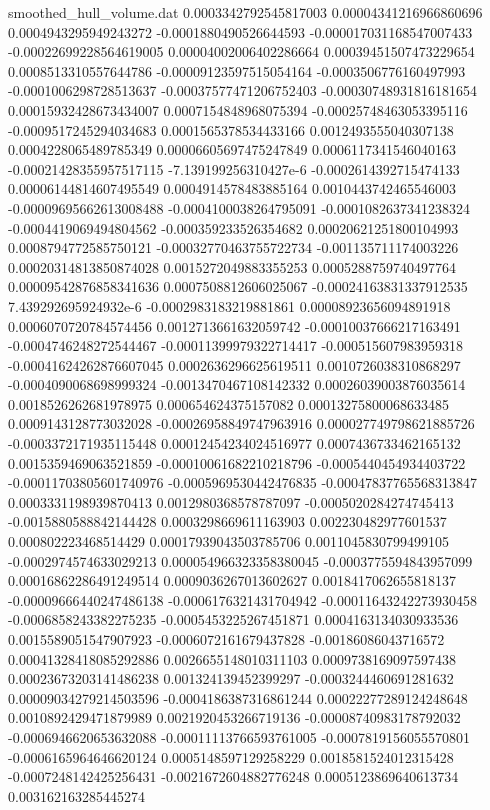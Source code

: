 \begin{filecontents}{smoothed_hull_volume.dat}
0.0003342792545817003	0.00004341216966860696	0.0004943295949243272	-0.0001880490526644593	-0.000017031168547007433	-0.00022699228564619005	0.00004002006402286664	0.00039451507473229654	0.0008513310557644786	-0.00009123597515054164	-0.0003506776160497993	-0.0001006298728513637	-0.00037577471206752403	-0.00030748931816181654	0.00015932428673434007	0.0007154848968075394	-0.00025748463053395116	-0.0009517245294034683	0.0001565378534433166	0.0012493555040307138
0.0004228065489785349	0.00006605697475247849	0.0006117341546040163	-0.00021428355957517115	-7.139199256310427e-6	-0.0002614392715474133	0.00006144814607495549	0.0004914578483885164	0.0010443742465546003	-0.00009695662613008488	-0.0004100038264795091	-0.0001082637341238324	-0.0004419069494804562	-0.000359233526354682	0.00020621251800104993	0.0008794772585750121	-0.00032770463755722734	-0.001135711174003226	0.00020314813850874028	0.0015272049883355253
0.0005288759740497764	0.00009542876858341636	0.0007508812606025067	-0.00024163831337912535	7.439292695924932e-6	-0.0002983183219881861	0.00008923656094891918	0.0006070720784574456	0.0012713661632059742	-0.00010037666217163491	-0.0004746248272544467	-0.00011399979322714417	-0.000515607983959318	-0.00041624262876607045	0.0002636296625619511	0.0010726038310868297	-0.0004090068698999324	-0.0013470467108142332	0.00026039003876035614	0.0018526262681978975
0.000654624375157082	0.00013275800068633485	0.0009143128773032028	-0.00026958849747963916	0.000027749798621885726	-0.0003372171935115448	0.00012454234024516977	0.0007436733462165132	0.0015359469063521859	-0.00010061682210218796	-0.0005440454934403722	-0.00011703805601740976	-0.0005969530442476835	-0.00047837765568313847	0.0003331198939870413	0.0012980368578787097	-0.0005020284274745413	-0.0015880588842144428	0.0003298669611163903	0.002230482977601537
0.000802223468514429	0.00017939043503785706	0.0011045830799499105	-0.0002974574633029213	0.000054966323358380045	-0.0003775594843957099	0.00016862286491249514	0.0009036267013602627	0.0018417062655818137	-0.00009666440247486138	-0.0006176321431704942	-0.00011643242273930458	-0.0006858243382275235	-0.0005453225267451871	0.0004163134030933536	0.0015589051547907923	-0.0006072161679437828	-0.00186086043716572	0.00041328418085292886	0.0026655148010311103
0.0009738169097597438	0.00023673203141486238	0.001324139452399297	-0.0003244460691281632	0.00009034279214503596	-0.0004186387316861244	0.00022277289124248648	0.0010892429471879989	0.0021920453266719136	-0.00008740983178792032	-0.0006946620653632088	-0.00011113766593761005	-0.0007819156055570801	-0.0006165964646620124	0.0005148597129258229	0.0018581524012315428	-0.0007248142425256431	-0.0021672604882776248	0.0005123869640613734	0.003162163285445274

\end{filecontents}
